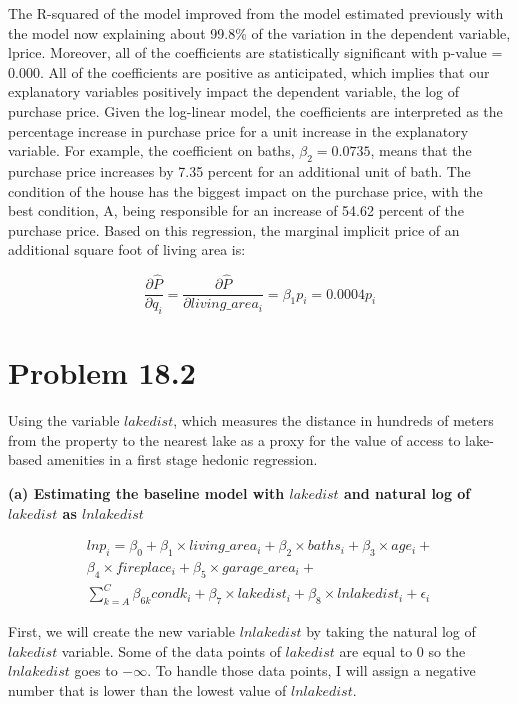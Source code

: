 \documentclass[11pt]{article}
\begin{document}
    The R-squared of the model improved from the model estimated previously
with the model now explaining about 99.8\% of the variation in the
dependent variable, lprice. Moreover, all of the coefficients are
statistically significant with p-value = 0.000. All of the coefficients
are positive as anticipated, which implies that our explanatory
variables positively impact the dependent variable, the log of purchase
price. Given the log-linear model, the coefficients are interpreted as
the percentage increase in purchase price for a unit increase in the
explanatory variable. For example, the coefficient on baths,
\(\beta_2 = 0.0735\), means that the purchase price increases by 7.35
percent for an additional unit of bath. The condition of the house has
the biggest impact on the purchase price, with the best condition, A,
being responsible for an increase of 54.62 percent of the purchase
price. Based on this regression, the marginal implicit price of an
additional square foot of living area is:

\begin{equation}
\frac{\partial \widehat{P}}{\partial q_i} = \frac{\partial \widehat{P}}{\partial living\_area_i} = \beta_1 p_i = 0.0004 p_i
\end{equation}

    \section{Problem 18.2}\label{problem-18.2}

Using the variable \(lakedist\), which measures the distance in hundreds
of meters from the property to the nearest lake as a proxy for the value
of access to lake-based amenities in a first stage hedonic regression.


 \textbf{(a)   Estimating the baseline model with \(lakedist\) and natural log of
\(lakedist\) as \(lnlakedist\)}

\begin{multline*}
ln p_i = \beta_0 + \beta_1 \times living\_area_i + 
\beta_2 \times baths_i + \beta_3 \times age_i + \\
\beta_4 \times fireplace_i + \beta_5 \times garage\_area_i +\\
\sum_{k=A}^{C} \beta_{6k}condk_i + \beta_7 \times lakedist_i + \beta_8 \times lnlakedist_i +\epsilon_i
\end{multline*}

    First, we will create the new variable \(lnlakedist\) by taking the
natural log of \(lakedist\) variable. Some of the data points of
\(lakedist\) are equal to 0 so the \(lnlakedist\) goes to \(-\infty\).
To handle those data points, I will assign a negative number that is
lower than the lowest value of \(lnlakedist\).
\end{document}
